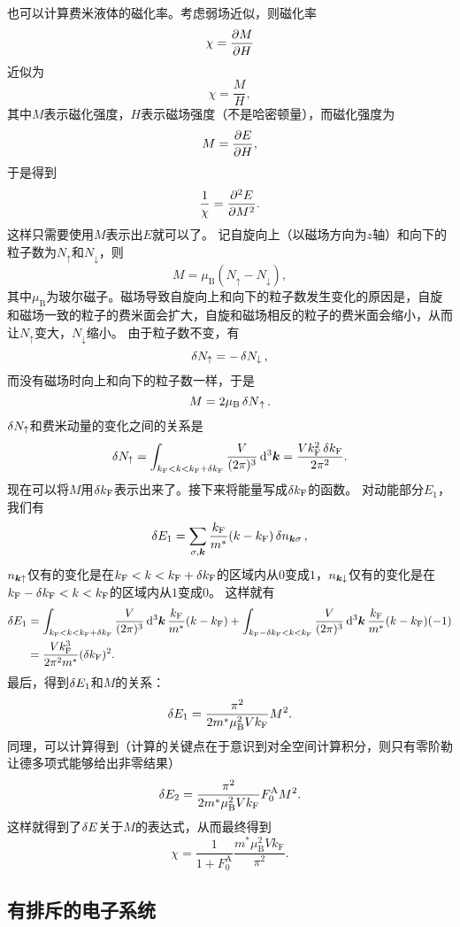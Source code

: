 \documentclass[hyperref, UTF8, a4paper]{ctexart}
\begin{document}
也可以计算费米液体的磁化率。考虑弱场近似，则磁化率
\[
    \chi = \pdv{M}{H}
\]
近似为
\[
    \chi = \frac{M}{H},
\]
其中$M$表示磁化强度，$H$表示磁场强度（不是哈密顿量），而磁化强度为
\[
    M = \pdv{E}{H},
\]
于是得到
\[
    \frac{1}{\chi} = \pdv[2]{E}{M}.
\]
这样只需要使用$M$表示出$E$就可以了。
记自旋向上（以磁场方向为$z$轴）和向下的粒子数为$N_\uparrow$和$N_\downarrow$，则
\[
    M = \mu_\text{B} (N_\uparrow - N_\downarrow),
\]
其中$\mu_\text{B}$为玻尔磁子。磁场导致自旋向上和向下的粒子数发生变化的原因是，自旋和磁场一致的粒子的费米面会扩大，自旋和磁场相反的粒子的费米面会缩小，从而让$N_\uparrow$变大，$N_\downarrow$缩小。
由于粒子数不变，有
\[
    \var{N_\uparrow} = - \var{N_\downarrow},
\]
而没有磁场时向上和向下的粒子数一样，于是
\[
    M = 2 \mu_\text{B} \var{N}_\uparrow.
\]
$\var{N_\uparrow}$和费米动量的变化之间的关系是
\[
    \var{N_\uparrow} = \int_{k_\text{F} < k < k_\text{F} + \var{k_\text{F}}} \frac{V}{(2\pi)^3} \dd[3]{\vb*{k}} = \frac{V k_\text{F}^2 \var{k_\text{F}}}{2\pi^2}.
\]
现在可以将$M$用$\var{k_\text{F}}$表示出来了。接下来将能量写成$\var{k_\text{F}}$的函数。
对动能部分$E_1$，我们有
\[
    \var{E_1} = \sum_{\sigma, \vb*{k}} \frac{k_\text{F}}{m^*} (k - k_\text{F}) \var{n}_{\vb*{k} \sigma},
\]
$n_{\vb*{k} \uparrow}$仅有的变化是在$k_\text{F} < k < k_\text{F} + \var{k_\text{F}}$的区域内从$0$变成$1$，$n_{\vb*{k} \downarrow}$仅有的变化是在$k_\text{F} - \var{k_\text{F}} < k < k_\text{F}$的区域内从$1$变成$0$。
这样就有
\[
    \begin{aligned}
        \var{E_1} &= \int_{k_\text{F} < k < k_\text{F} + \var{k_\text{F}}} \frac{V}{(2\pi)^3} \dd[3]{\vb*{k}} \frac{k_\text{F}}{m^*} (k - k_\text{F}) + \int_{k_\text{F} - \var{k_\text{F}} < k < k_\text{F}} \frac{V}{(2\pi)^3} \dd[3]{\vb*{k}} \frac{k_\text{F}}{m^*} (k - k_\text{F}) (-1) \\
        &= \frac{V k_\text{F}^3}{2 \pi^2 m^*} (\var{k_\text{F}})^2.
    \end{aligned}
\]
最后，得到$\var{E_1}$和$M$的关系：
\[
    \var{E_1} = \frac{\pi^2}{2 m^* \mu_\text{B}^2 V k_\text{F}} M^2.
\]
同理，可以计算得到（计算的关键点在于意识到对全空间计算积分，则只有零阶勒让德多项式能够给出非零结果）
\[
    \var{E_2} = \frac{\pi^2}{2 m^* \mu_\text{B}^2 V k_\text{F}} F_0^\text{A} M^2.
\]
这样就得到了$\var{E}$关于$M$的表达式，从而最终得到
\begin{equation}
    \chi = \frac{1}{1 + F_0^\text{A}} \frac{m^* \mu_\text{B}^2 V k_\text{F}}{\pi^2}.
\end{equation}

\subsection{有排斥的电子系统}\label{sec:repel-gas}
\end{document}
